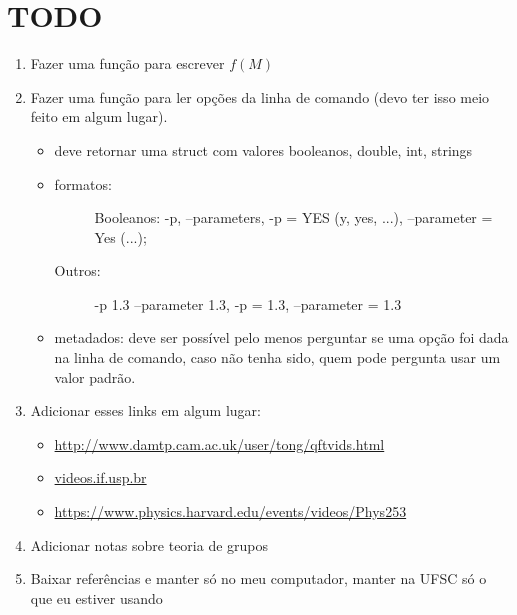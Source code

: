\chapter{TODO}

\begin{enumerate}
\item Fazer uma função para escrever $f(M)$

\item Fazer uma função para ler opções da linha de comando (devo ter isso meio feito em algum lugar).
	\begin{itemize}
	\item deve retornar uma struct com valores booleanos, double, int, strings
	\item
		\begin{description}
			\item[formatos:] Booleanos: -p, --parameters, -p = YES (y, yes, ...), --parameter = Yes (...);
			\item[Outros:] -p 1.3 --parameter 1.3, -p = 1.3, --parameter = 1.3
		\end{description}
	\item metadados: deve ser possível pelo menos perguntar se uma opção foi dada na linha de comando, caso não tenha sido, quem pode pergunta usar um valor padrão.
	\end{itemize}

\item Adicionar esses links em algum lugar:
	\begin{itemize}
		\item \url{http://www.damtp.cam.ac.uk/user/tong/qftvids.html}
		\item \url{videos.if.usp.br}
		\item \url{https://www.physics.harvard.edu/events/videos/Phys253}
	\end{itemize}
\item Adicionar notas sobre teoria de grupos

\item Baixar referências e manter só no meu computador, manter na UFSC só o que eu estiver usando
\end{enumerate}
